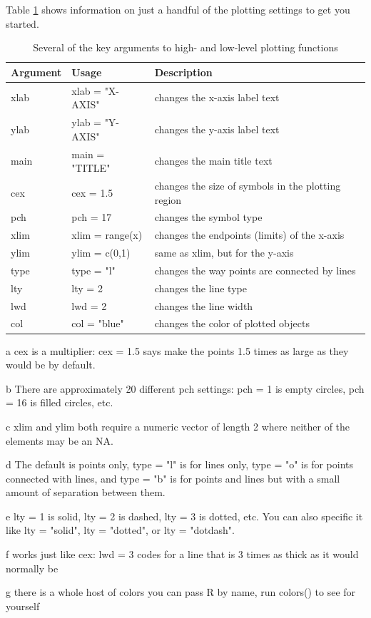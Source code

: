 \documentclass[]{book}
\theoremstyle{definition}
\theoremstyle{definition}
\theoremstyle{definition}
\theoremstyle{remark}
\begin{document}
Table \ref{tab:plot-arg-table-pdf} shows information on just a handful
of the plotting settings to get you started.

\begin{table}

\caption{\label{tab:plot-arg-table-pdf}Several of the key arguments to high- and low-level plotting functions}
\centering
\begin{threeparttable}
\begin{tabular}[t]{>{\ttfamily}l>{\ttfamily}l>{\raggedright\arraybackslash}p{25em}}
\toprule
Argument & Usage & Description\\
\midrule
xlab & xlab = "X-AXIS" & changes the x-axis label text\\
ylab & ylab = "Y-AXIS" & changes the y-axis label text\\
main & main = "TITLE" & changes the main title text\\
cex & cex = 1.5 & changes the size of symbols in the plotting region\\
pch & pch = 17 & changes the symbol type\\
\addlinespace
xlim & xlim = range(x) & changes the endpoints (limits) of the x-axis\\
ylim & ylim = c(0,1) & same as xlim, but for the y-axis\\
type & type = "l" & changes the way points are connected by lines\\
lty & lty = 2 & changes the line type\\
lwd & lwd = 2 & changes the line width\\
col & col = "blue" & changes the color of plotted objects\\
\bottomrule
\end{tabular}
\begin{tablenotes}
\item[a] cex is a multiplier: cex = 1.5 says make the points 1.5 times as large as they would be by default.
\item[b] There are approximately 20 different pch settings: pch = 1 is empty circles, pch = 16 is filled circles, etc.
\item[c] xlim and ylim both require a numeric vector of length 2 where neither of the elements may be an NA.
\item[d] The default is points only, type = "l" is for lines only, type = "o" is for points connected with lines, and type = "b" is for points and lines but with a small amount of separation between them.
\item[e] lty = 1 is solid, lty = 2 is dashed, lty = 3 is dotted, etc. You can also specific it like lty = "solid", lty = "dotted", or lty = "dotdash".
\item[f] works just like cex: lwd = 3 codes for a line that is 3 times as thick as it would normally be
\item[g] there is a whole host of colors you can pass R by name, run colors() to see for yourself
\end{tablenotes}
\end{threeparttable}
\end{table}
\end{document}
